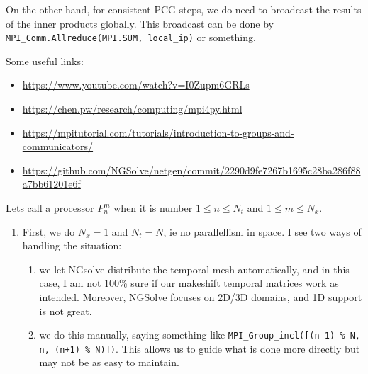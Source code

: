 \documentclass[11pt,a4paper]{amsart}
\theoremstyle{definition}
\begin{document}
On the other hand, for
consistent PCG steps, we do need to broadcast the results of the inner products
globally.  This broadcast can be done by \verb`MPI_Comm.Allreduce(MPI.SUM, local_ip)` or something.

Some useful links:
\begin{itemize}
  \item \url{https://www.youtube.com/watch?v=I0Zupm6GRLs}
  \item \url{https://chen.pw/research/computing/mpi4py.html}
  \item \url{https://mpitutorial.com/tutorials/introduction-to-groups-and-communicators/}
  \item \url{https://github.com/NGSolve/netgen/commit/2290d9fe7267b1695c28ba286f88a7bb61201e6f}
\end{itemize}

Lets call a processor $P_n^m$ when it is number $1 \leq n \leq N_t$ and $1 \leq m \leq N_x$.
\begin{enumerate}
  \item First, we do $N_x = 1$ and $N_t = N$, ie no parallellism in space. I see
    two ways of handling the situation:
    \begin{enumerate}
      \item we let NGsolve distribute the temporal
      mesh automatically, and in this case, I am not 100\% sure if our makeshift
      temporal matrices work as intended. Moreover, NGSolve focuses on 2D/3D domains,
      and 1D support is not great.
    \item we do this manually, saying something
      like \verb`MPI_Group_incl([(n-1) % N, n, (n+1) % N)])`.
      This allows us to guide what is done more directly but may not be as easy to maintain.
    \end{enumerate}
\end{enumerate}
\end{document}
